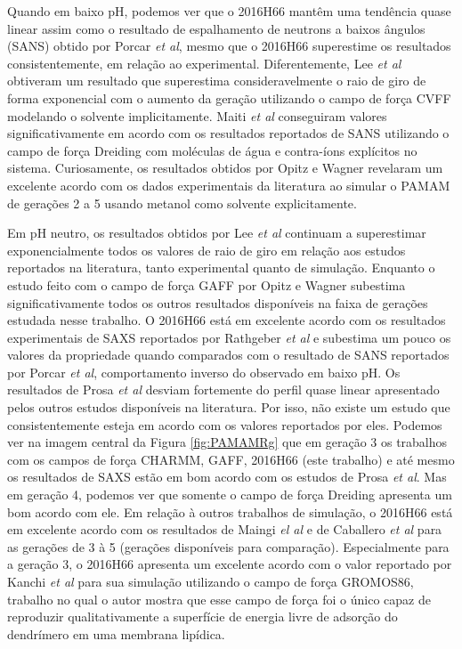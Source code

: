Quando em baixo pH, podemos ver que o 2016H66\cite{Horta2016} mantêm uma tendência quase linear assim como o resultado de espalhamento de neutrons a baixos ângulos (SANS) obtido por Porcar \textit{et al}\cite{Porcar2008}, mesmo que o 2016H66\cite{Horta2016} superestime os resultados consistentemente, em relação ao experimental.
Diferentemente, Lee \textit{et al}\cite{Lee2002} obtiveram um resultado que superestima consideravelmente o raio de giro de forma exponencial com o aumento da geração utilizando o campo de força CVFF\cite{Lifson1979} modelando o solvente implicitamente. 
Maiti \textit{et al}\cite{Maiti2005} conseguiram valores significativamente em acordo com os resultados reportados de SANS\cite{Porcar2008} utilizando o campo de força Dreiding\cite{Mayo1990} com moléculas de água e contra-íons explícitos no sistema.
Curiosamente, os resultados obtidos por Opitz e Wagner\cite{Opitz2006} revelaram um excelente acordo com os dados experimentais da literatura ao simular o PAMAM de gerações 2 a 5 usando metanol como solvente explicitamente. 

Em pH neutro, os resultados obtidos por Lee \textit{et al} continuam a superestimar exponencialmente todos os valores de raio de giro em relação aos estudos reportados na literatura, tanto experimental quanto de simulação.
Enquanto o estudo feito com o campo de força GAFF por Opitz e Wagner\cite{Opitz2006} subestima significativamente todos os outros resultados disponíveis na faixa de gerações estudada nesse trabalho.
O 2016H66\cite{Horta2016} está em excelente acordo com os resultados experimentais de SAXS reportados por Rathgeber \textit{et al}\cite{Rathgeber2002} e subestima um pouco os valores da propriedade quando comparados com o resultado de SANS reportados por Porcar \textit{et al}\cite{Porcar2008}, comportamento inverso do observado em baixo pH.
Os resultados de Prosa \textit{et al}\cite{Prosa1997} desviam fortemente do perfil quase linear apresentado pelos outros estudos disponíveis na literatura. Por isso, não existe um estudo que consistentemente esteja em acordo com os valores reportados por eles.
Podemos ver na imagem central da Figura \ref{fig:PAMAMRg} que em geração 3 os trabalhos com os campos de força CHARMM\cite{Caballero2013, Kanchi2018}, GAFF\cite{Maingi2012, Barraza2018}, 2016H66 (este trabalho) e até mesmo os resultados de SAXS\cite{Rathgeber2002} estão em bom acordo com os estudos de Prosa \textit{et al}\cite{Prosa1997}.
Mas em geração 4, podemos ver que somente o campo de força Dreiding \cite{Maiti2005} apresenta um bom acordo com ele.
Em relação à outros trabalhos de simulação, o 2016H66\cite{Horta2016} está em excelente acordo com os resultados de Maingi \textit{el al}\cite{Maingi2012} e de Caballero \textit{et al}\cite{Caballero2013} para as gerações de 3 à 5 (gerações disponíveis para comparação).
Especialmente para a geração 3, o 2016H66\cite{Horta2016} apresenta um excelente acordo com o valor reportado por Kanchi \textit{et al}\cite{Kanchi2018} para sua simulação utilizando o campo de força GROMOS86, trabalho no qual o autor mostra que esse campo de força foi o único capaz de reproduzir qualitativamente a superfície de energia livre de adsorção do dendrímero em uma membrana lipídica.

